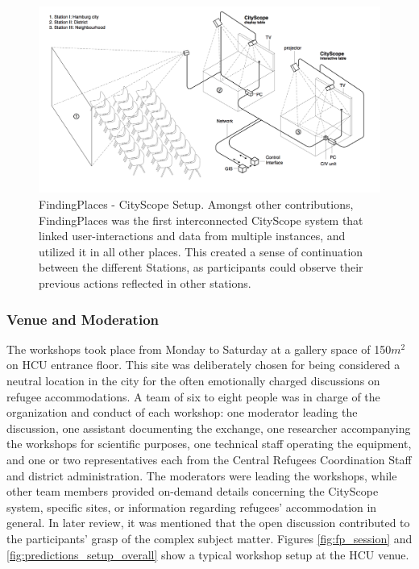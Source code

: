 {{        \begin{figure}[!htb]
            \begin{center}
                \includegraphics[width=1\textwidth]{chapters/consensus/findingplaces/figures/fp8.png}
            \end{center}
            \caption{FindingPlaces - CityScope Setup. Amongst other contributions, FindingPlaces was the first interconnected CityScope system that linked user-interactions and data from multiple instances, and utilized it in all other places. This created a sense of continuation between the different Stations, as participants could observe their previous actions reflected in other stations.}
            \label{fig:predictions_setup_overall}
        \end{figure}

        \subsubsection{Venue and Moderation}
        {
            The workshops took place from Monday to Saturday at a gallery space of 150$m^2$ on HCU entrance floor. This site was deliberately chosen for being considered a neutral location in the city for the often emotionally charged discussions on refugee accommodations. A team of six to eight people was in charge of the organization and conduct of each workshop: one moderator leading the discussion, one assistant documenting the exchange, one researcher accompanying the workshops for scientific purposes, one technical staff operating the equipment, and one or two representatives each from the Central Refugees Coordination Staff and district administration. The moderators were leading the workshops, while other team members provided on-demand details concerning the CityScope system, specific sites, or information regarding refugees' accommodation in general. In later review, it was mentioned that the open discussion contributed to the participants' grasp of the complex subject matter. Figures \eqref{fig:fp_session} and \eqref{fig:predictions_setup_overall} show a typical workshop setup at the HCU venue.
        }
    }

}
